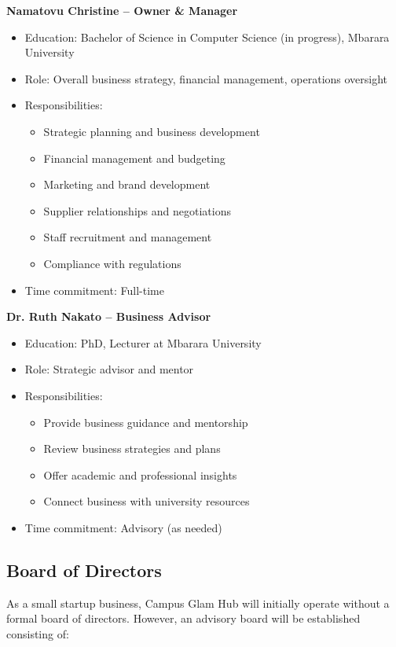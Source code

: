 \documentclass[a4paper,12pt]{article}
\begin{document}
\textbf{Namatovu Christine -- Owner \& Manager}
\begin{itemize}[leftmargin=2em]
    \item Education: Bachelor of Science in Computer Science (in progress), Mbarara University
    \item Role: Overall business strategy, financial management, operations oversight
    \item Responsibilities:
    \begin{itemize}
        \item Strategic planning and business development
        \item Financial management and budgeting
        \item Marketing and brand development
        \item Supplier relationships and negotiations
        \item Staff recruitment and management
        \item Compliance with regulations
    \end{itemize}
    \item Time commitment: Full-time
\end{itemize}

\textbf{Dr. Ruth Nakato -- Business Advisor}
\begin{itemize}[leftmargin=2em]
    \item Education: PhD, Lecturer at Mbarara University
    \item Role: Strategic advisor and mentor
    \item Responsibilities:
    \begin{itemize}
        \item Provide business guidance and mentorship
        \item Review business strategies and plans
        \item Offer academic and professional insights
        \item Connect business with university resources
    \end{itemize}
    \item Time commitment: Advisory (as needed)
\end{itemize}

\subsection{Board of Directors}

As a small startup business, Campus Glam Hub will initially operate without a formal board of directors. However, an advisory board will be established consisting of:
\end{document}
